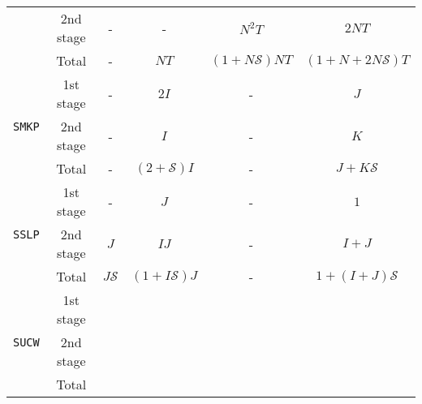 \begin{table}[H]
{\begin{tabular}{@{}cccccc@{}}
			& 2nd stage & -              & -                                  & $N^2 T$              & $2NT$                     \\ \cmidrule(l){2-6} 
			& Total          & -              & $NT$                               & $(1+N\mathcal{S})NT$ & $(1+N+2N\mathcal{S})T$    \\ \midrule
			\multirow{3}{*}{\texttt{SMKP}}   & 1st stage & -              & $2I$                               & -                    & $J$                       \\
			& 2nd stage & -              & $I$                                & -                    & $K$                       \\ \cmidrule(l){2-6} 
			& Total          & -              & $(2+\mathcal{S})I$                 & -                    & $J+K\mathcal{S}$          \\ \midrule
			\multirow{3}{*}{\texttt{SSLP}}   & 1st stage & -              & $J$                                & -                    & $1$                       \\
			& 2nd stage & $J$            & $IJ$                               & -                    & $I+J$                     \\ \cmidrule(l){2-6} 
			& Total          & $J\mathcal{S}$ & $(1+I\mathcal{S})J$                & -                    & $1+(I+J)\mathcal{S}$      \\ \midrule
			\multirow{3}{*}{\texttt{SUCW}}   & 1st stage &                &                                    &                      &                           \\
			& 2nd stage &                &                                    &                      &                           \\ \cmidrule(l){2-6} 
			& Total          &                &                                    &                      &                           \\ \bottomrule
		\end{tabular}%
	}
\end{table}


